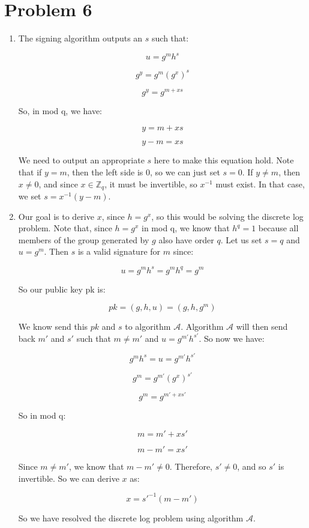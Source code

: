 \documentclass{article}
\begin{document}
\section*{Problem 6}
\begin{enumerate}
\item %
The signing algorithm outputs an $s$ such that:

$$u = g^m h^s$$

$$g^y = g^m (g^x)^s$$

$$g^y = g^{m + xs}$$

So, in mod q, we have:

$$y = m + xs$$

$$y - m = xs$$

We need to output an appropriate $s$ here to make this equation hold. Note that if $y = m$, then the left side is 0, so we can just set $s = 0$. If $y \neq m$, then $x \neq 0$, and since $x \in \mathbb{Z}_q$, it must be invertible, so $x^{-1}$ must exist. In that case, we set $s = x^{-1}(y - m)$.

\item %

Our goal is to derive $x$, since $h = g^x$, so this would be solving the discrete log problem. Note that, since $h = g^x$ in mod q, we know that $h^q = 1$ because all members of the group generated by $g$ also have order $q$. Let us set $s = q$ and $u = g^m$. Then $s$ is a valid signature for $m$ since:

$$u = g^m h^s = g^m h^q = g^m$$

So our public key pk is:

$$pk = (g, h, u) = (g, h, g^m)$$

We know send this $pk$ and $s$ to algorithm $\mathcal{A}$. Algorithm $\mathcal{A}$ will then send back $m'$ and $s'$ such that $m \neq m'$ and $u = g^{m'} h^{s'}$. So now we have:

$$g^m h^s = u = g^{m'} h^{s'}$$

$$g^m = g^{m'} (g^{x})^{s'}$$

$$g^m = g^{m' + xs'}$$

So in mod q:

$$m = m' + xs'$$

$$m - m' = xs'$$

Since $m \neq m'$, we know that $m - m' \neq 0$. Therefore, $s' \neq 0$, and so $s'$ is invertible. So we can derive $x$ as:

$$x = s'^{-1}(m - m')$$

So we have resolved the discrete log problem using algorithm $\mathcal{A}$.


\end{enumerate}
\end{document}
